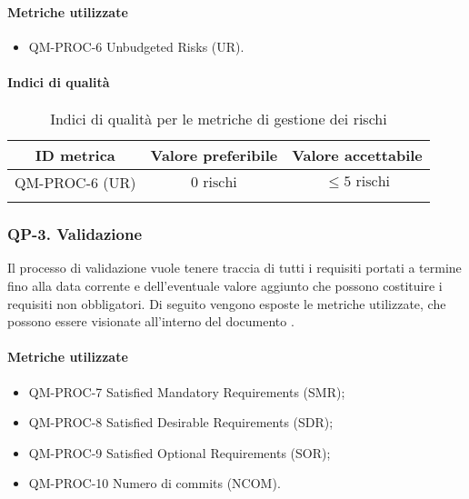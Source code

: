 		\paragraph{Metriche utilizzate}

			\begin{itemize}
				\item QM-PROC-6 Unbudgeted Risks (UR).
			\end{itemize}

		\paragraph{Indici di qualità}

			\begin{center}
				\begin{longtable}{|c|c|c|}
				\hline
				\rowcolor{lighter-grayer}
				\textbf{ID metrica} & \textbf{Valore preferibile} & \textbf{Valore accettabile}\\
				\hline
				\endfirsthead
				\hline
				QM-PROC-6 (UR) & \(0 \text{ rischi}\) & \(\le 5 \text{ rischi}\) \\
				\hline
				\caption{Indici di qualità per le metriche di gestione dei rischi}
				\end{longtable}
			\end{center}

	\subsubsection{QP-3. Validazione}

		Il processo di validazione vuole tenere traccia di tutti i requisiti portati a termine fino alla data corrente e dell'eventuale valore aggiunto che possono costituire i requisiti non obbligatori.
		Di seguito vengono esposte le metriche utilizzate, che possono essere visionate all'interno del documento .

		\paragraph{Metriche utilizzate}

			\begin{itemize}
				\item QM-PROC-7 Satisfied Mandatory Requirements (SMR);
				\item QM-PROC-8 Satisfied Desirable Requirements (SDR);
				\item QM-PROC-9 Satisfied Optional Requirements (SOR);
				\item QM-PROC-10 Numero di commits (NCOM).
			\end{itemize}


